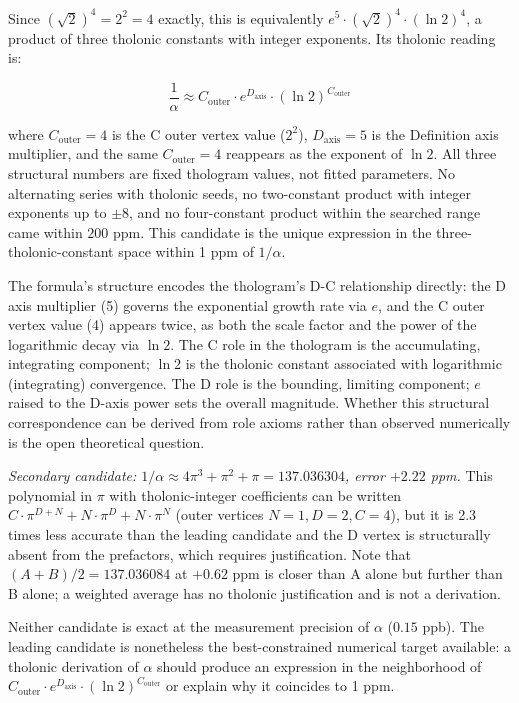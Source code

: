\documentclass[12pt]{article}
\begin{document}
Since \((\sqrt{2})^4 = 2^2 = 4\) exactly, this is equivalently
\(e^5 \cdot (\sqrt{2})^4 \cdot (\ln 2)^4\), a product of three tholonic
constants with integer exponents. Its tholonic reading is:

\[\frac{1}{\alpha} \approx C_\text{outer} \cdot e^{D_\text{axis}} \cdot (\ln 2)^{C_\text{outer}}\]

where \(C_\text{outer} = 4\) is the C outer vertex value (\(2^2\)),
\(D_\text{axis} = 5\) is the Definition axis multiplier, and the same
\(C_\text{outer} = 4\) reappears as the exponent of \(\ln 2\). All three
structural numbers are fixed thologram values, not fitted parameters. No
alternating series with tholonic seeds, no two-constant product with
integer exponents up to \(\pm 8\), and no four-constant product within
the searched range came within \(200\) ppm. This candidate is the unique
expression in the three-tholonic-constant space within 1 ppm of
\(1/\alpha\).

The formula's structure encodes the thologram's D-C relationship
directly: the D axis multiplier (5) governs the exponential growth rate
via \(e\), and the C outer vertex value (4) appears twice, as both the
scale factor and the power of the logarithmic decay via \(\ln 2\). The C
role in the thologram is the accumulating, integrating component;
\(\ln 2\) is the tholonic constant associated with logarithmic
(integrating) convergence. The D role is the bounding, limiting
component; \(e\) raised to the D-axis power sets the overall magnitude.
Whether this structural correspondence can be derived from role axioms
rather than observed numerically is the open theoretical question.

\emph{Secondary candidate:
\(1/\alpha \approx 4\pi^3 + \pi^2 + \pi = 137.036304\), error \(+2.22\)
ppm.} This polynomial in \(\pi\) with tholonic-integer coefficients can
be written \(C \cdot \pi^{D+N} + N \cdot \pi^D + N \cdot \pi^N\) (outer
vertices \(N=1, D=2, C=4\)), but it is 2.3 times less accurate than the
leading candidate and the D vertex is structurally absent from the
prefactors, which requires justification. Note that
\((A + B)/2 = 137.036084\) at \(+0.62\) ppm is closer than A alone but
further than B alone; a weighted average has no tholonic justification
and is not a derivation.

Neither candidate is exact at the measurement precision of \(\alpha\)
(\(0.15\) ppb). The leading candidate is nonetheless the
best-constrained numerical target available: a tholonic derivation of
\(\alpha\) should produce an expression in the neighborhood of
\(C_\text{outer} \cdot e^{D_\text{axis}} \cdot (\ln 2)^{C_\text{outer}}\)
or explain why it coincides to 1 ppm.
\end{document}
